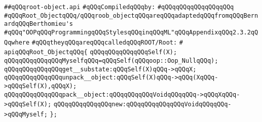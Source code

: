 \label{src/lib/src/root-object.api}
\verb|##qQQqroot-object.api|\newline
\newline
\verb|#qQQqCompiledqQQqby:|\newline
\verb|#qQQqqQQqqQQqqQQqqQQq|\newline
\newline
\verb|#qQQqRoot_ObjectqQQq/qQQqroob_objectqQQqareqQQqadaptedqQQqfromqQQqBernardqQQqBerthomieu's|\newline
\verb|#qQQq"OOPqQQqProgrammingqQQqStylesqQQqinqQQqML"qQQqAppendixqQQq2.3.2qQQqwhere|\newline
\verb|#qQQqtheyqQQqareqQQqcalledqQQqROOT/Root:|\newline
\verb|#|\newline
\verb|apiqQQqRoot_ObjectqQQq{|\newline
\newline
\verb|qQQqqQQqqQQqqQQqSelf(X);|\newline
\verb|qQQqqQQqqQQqqQQqMyselfqQQq=qQQqSelf(qQQqoop::Oop_NullqQQq);|\newline
\newline
\verb|qQQqqQQqqQQqqQQqget__substate:qQQqSelf(X)qQQq->qQQqX;|\newline
\verb|qQQqqQQqqQQqqQQqunpack__object:qQQqSelf(X)qQQq->qQQq(XqQQq->qQQqSelf(X),qQQqX);|\newline
\verb|qQQqqQQqqQQqqQQqpack__object:qQQqqQQqqQQqVoidqQQqqQQq->qQQqXqQQq->qQQqSelf(X);|\newline
\verb|qQQqqQQqqQQqqQQqnew:qQQqqQQqqQQqqQQqVoidqQQqqQQq->qQQqMyself;|\newline
\verb|};|\newline
\newline


